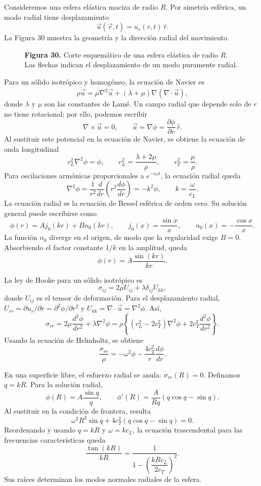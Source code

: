 Consideremos una esfera elástica maciza de radio $R$. Por simetría esférica, un modo radial tiene desplazamiento
\[
\vec u(\vec r,t)=u_r(r,t)\,\hat r.
\]
La Figura 30 muestra la geometría y la dirección radial del movimiento.

\begin{figure}[H]
\centering

\par\medskip
\textbf{Figura 30.} Corte esquemático de una esfera elástica de radio $R$. Las flechas indican el desplazamiento de un modo puramente radial.
\end{figure}

Para un sólido isotrópico y homogéneo, la ecuación de Navier es
\[
\rho\ddot{\vec u}
=\mu\nabla^2\vec u+(\lambda+\mu)\nabla(\nabla\cdot\vec u),
\]
donde $\lambda$ y $\mu$ son las constantes de Lamé. Un campo radial que depende solo de $r$ no tiene rotacional; por ello, podemos escribir
\[
\nabla\times\vec u=0,
\qquad
\vec u=\nabla\phi
=\frac{\partial\phi}{\partial r}\,\hat r.
\]
Al sustituir este potencial en la ecuación de Navier, se obtiene la ecuación de onda longitudinal
\[
c_L^2\nabla^2\phi=\ddot\phi,
\qquad
c_L^2=\frac{\lambda+2\mu}{\rho},
\qquad
c_T^2=\frac{\mu}{\rho}.
\]
Para oscilaciones armónicas proporcionales a $e^{-i\omega t}$, la ecuación radial queda
\[
\nabla^2\phi
=\frac{1}{r^2}\frac{d}{dr}\left(r^2\frac{d\phi}{dr}\right)
=-k^2\phi,
\qquad k=\frac{\omega}{c_L}.
\]
La ecuación radial es la ecuación de Bessel esférica de orden cero. Su solución general puede escribirse como
\[
\phi(r)=A j_0(kr)+B n_0(kr),
\qquad
j_0(x)=\frac{\sin x}{x},
\qquad
n_0(x)=-\frac{\cos x}{x}.
\]
La función $n_0$ diverge en el origen, de modo que la regularidad exige $B=0$. Absorbiendo el factor constante $1/k$ en la amplitud, queda
\[
\phi(r)=A\frac{\sin(kr)}{kr}.
\]

La ley de Hooke para un sólido isotrópico es
\[
\sigma_{ij}=2\mu U_{ij}+\lambda\delta_{ij}U_{kk},
\]
donde $U_{ij}$ es el tensor de deformación. Para el desplazamiento radial, $U_{rr}=\partial u_r/\partial r=\partial^2\phi/\partial r^2$ y $U_{kk}=\nabla\cdot\vec u=\nabla^2\phi$. Así,
\[
\sigma_{rr}
=2\mu\frac{d^2\phi}{dr^2}+\lambda\nabla^2\phi
=\rho\left\{(c_L^2-2c_T^2)\nabla^2\phi
+2c_T^2\frac{d^2\phi}{dr^2}\right\}.
\]
Usando la ecuación de Helmholtz, se obtiene
\[
\frac{\sigma_{rr}}{\rho}
=-\omega^2\phi-\frac{4c_T^2}{r}\frac{d\phi}{dr}.
\]

En una superficie libre, el esfuerzo radial se anula: $\sigma_{rr}(R)=0$. Definamos $q=kR$. Para la solución radial,
\[
\phi(R)=A\frac{\sin q}{q},
\qquad
\phi'(R)=\frac{A}{Rq}(q\cos q-\sin q).
\]
Al sustituir en la condición de frontera, resulta
\[
\omega^2R^2\sin q+4c_T^2(q\cos q-\sin q)=0.
\]
Reordenando y usando $q=kR$ y $\omega=kc_L$, la ecuación trascendental para las frecuencias características queda
\[
\frac{\tan(kR)}{kR}
=\frac{1}{1-\left(\dfrac{kR c_L}{2c_T}\right)^2}.
\]
Sus raíces determinan los modos normales radiales de la esfera.

